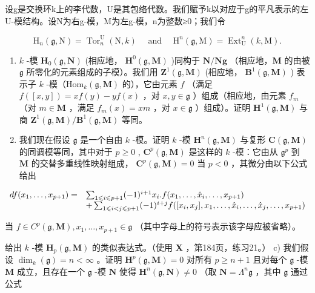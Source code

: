 设g是交换环k上的李代数，U是其包络代数。我们赋予k以对应于g的平凡表示的左U-模结构。设N为右g-模，M为左g-模，n为整数≥0；我们令

\[
\mathrm{H} _ {n} (\mathfrak {g}, \mathrm{N}) = \operatorname{Tor} _ {n} ^ {\mathrm{U}} (\mathrm{N}, k) \quad \text { and } \quad \mathrm{H} ^ {n} (\mathfrak {g}, \mathrm{M}) = \operatorname{Ext} _ {\mathrm{U}} ^ {n} (k, \mathrm{M}).
\]

\begin{enumerate}
\def\labelenumi{\alph{enumi})}
\item
  \(k\) -模 \(\mathbf{H}_0(\mathfrak{g}, \mathbf{N})\) (相应地， \(\mathbf{H}^0(\mathfrak{g}, \mathbf{M})\) )同构于 \(\mathbf{N}/\mathbf{Ng}\) （相应地，\(\mathbf{M}\) 的由被 \(\mathfrak{g}\) 所零化的元素组成的子模）。我们用 \(\mathbf{Z}^1(\mathfrak{g}, \mathbf{M})\) (相应地， \(\mathbf{B}^1(\mathfrak{g}, \mathbf{M})\) ) 表示子 \(k\) -模（\(\mathrm{Hom}_k(\mathfrak{g}, \mathbf{M})\) 的），它由元素 \(f\) （满足 \(f([x, y]) = xf(y) - yf(x)\) ，对 \(x, y \in \mathfrak{g}\) ）组成（相应地，由元素 \(f_m\) （对 \(m \in \mathbf{M}\) ，满足 \(f_m(x) = xm\) ，对 \(x \in \mathfrak{g}\) ）组成）。证明 \(\mathbf{H}^1(\mathfrak{g}, \mathbf{M})\) 与商 \(\mathbf{Z}^1(\mathfrak{g}, \mathbf{M})/\mathbf{B}^1(\mathfrak{g}, \mathbf{M})\) 等同。
\item
  我们现在假设 \(\mathfrak{g}\) 是一个自由 \(k\) -模。证明 \(k\) -模 \(\mathbf{H}^n(\mathfrak{g}, \mathbf{M})\) 与复形 \(\mathbf{C}(\mathfrak{g}, \mathbf{M})\) 的同调模等同，其中对于 \(p \geqslant 0\) , \(\mathbf{C}^p(\mathfrak{g}, \mathbf{M})\) 是这样的 \(k\) -模：它由从 \(\mathfrak{g}^p\) 到 \(\mathbf{M}\) 的交替多重线性映射组成， \(\mathbf{C}^p(\mathfrak{g}, \mathbf{M}) = 0\) 当 \(p < 0\) ，其微分由以下公式给出
\end{enumerate}

\[
\begin{array}{r l} d f (x _ {1}, \dots , x _ {p + 1}) = & \sum_ {1 \leqslant i \leqslant p + 1} (- 1) ^ {i + 1} x _ {i}. f (x _ {1}, \dots , \hat {x} _ {i}, \dots , x _ {p + 1}) \\ & + \sum_ {1 \leqslant i <   j \leqslant p + 1} (- 1) ^ {i + j} f ([ x _ {i}, x _ {j} ], x _ {1}, \dots , \hat {x} _ {i}, \dots , \hat {x} _ {j}, \dots , x _ {p + 1}) \end{array}
\]

当 \(f \in C^{p}(\mathfrak{g}, \mathbf{M}), x_{1}, \ldots, x_{p+1} \in \mathfrak{g}\) （其中字母上的符号表示该字母应被省略）。

给出 \(k\) -模 \(\mathbf{H}_p(\mathfrak{g}, \mathbf{M})\) 的类似表达式。（使用 \(\mathbf{X}\) ，第184页，练习21。） c) 我们假设 \(\dim_k(\mathfrak{g}) = n < \infty\) 。证明 \(\mathbf{H}^p(\mathfrak{g}, \mathbf{M}) = 0\) 对所有 \(p \geqslant n + 1\) 且对每个 \(\mathfrak{g}\) -模 \(\mathbf{M}\) 成立，且存在一个 \(\mathfrak{g}\) -模 \(\mathbf{N}\) 使得 \(\mathbf{H}^n(\mathfrak{g}, \mathbf{N}) \neq 0\) （取 \(\mathbf{N} = \Lambda^n\mathfrak{g}\) ，其中 \(\mathfrak{g}\) 通过公式

